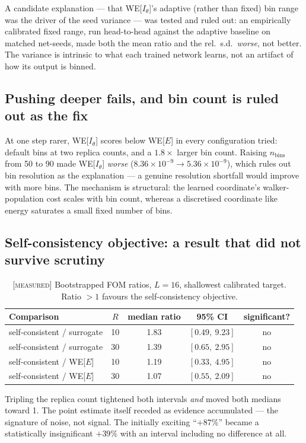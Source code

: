 \documentclass[11pt,a4paper]{article}
\newcommand{\MEAS}{\textcolor{blue!60!black}{\footnotesize[\textsc{measured}]}}
\begin{document}
A candidate explanation --- that WE[$I_\theta$]'s adaptive (rather than fixed) bin range was the
driver of the seed variance --- was tested and ruled out: an empirically calibrated fixed range,
run head-to-head against the adaptive baseline on matched net-seeds, made both the mean ratio and
the rel.\ s.d.\ \emph{worse}, not better. The variance is intrinsic to what each trained network
learns, not an artifact of how its output is binned.

\subsection{Pushing deeper fails, and bin count is ruled out as the fix}
At one step rarer, WE[$I_\theta$] scores below WE[$E$] in every configuration tried: default bins
at two replica counts, and a $1.8\times$ larger bin count. Raising $n_{\text{bins}}$ from 50 to 90
made WE[$I_\theta$] \emph{worse} ($8.36\times10^{-9}\to5.36\times10^{-9}$), which rules out bin
resolution as the explanation --- a genuine resolution shortfall would improve with more bins.
The mechanism is structural: the learned coordinate's walker-population cost scales with bin
count, whereas a discretised coordinate like energy saturates a small fixed number of bins.

\subsection{Self-consistency objective: a result that did not survive scrutiny}
\begin{table}[H]\centering\small
\caption{\MEAS{} Bootstrapped FOM ratios, $L=16$, shallowest calibrated target. Ratio $>1$ favours
the self-consistency objective.}
\begin{tabular}{lcccc}\toprule
Comparison & $R$ & median ratio & 95\% CI & significant?\\\midrule
self-consistent / surrogate & 10 & 1.83 & $[0.49,\ 9.23]$ & no\\
self-consistent / surrogate & 30 & 1.39 & $[0.65,\ 2.95]$ & no\\
self-consistent / WE[$E$] & 10 & 1.19 & $[0.33,\ 4.95]$ & no\\
self-consistent / WE[$E$] & 30 & 1.07 & $[0.55,\ 2.09]$ & no\\
\bottomrule\end{tabular}
\end{table}

Tripling the replica count tightened both intervals \emph{and} moved both medians toward 1. The
point estimate itself receded as evidence accumulated --- the signature of noise, not signal. The
initially exciting ``$+87\%$'' became a statistically insignificant $+39\%$ with an interval
including no difference at all.
\end{document}
